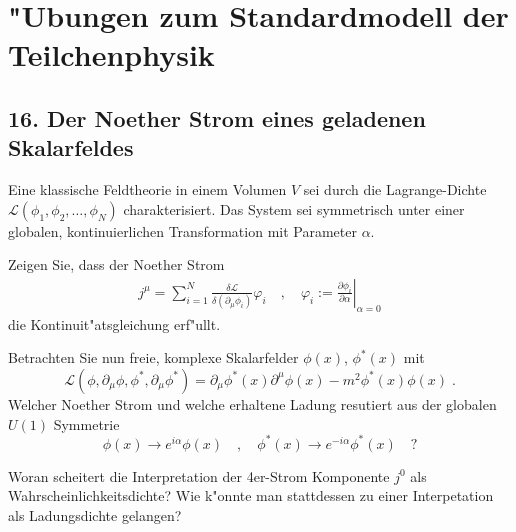 \documentclass[11pt,a4paper]{article}
\begin{document}
\section*{"Ubungen zum Standardmodell der Teilchenphysik}
\subsection*{16. Der Noether Strom eines geladenen Skalarfeldes}
Eine klassische Feldtheorie in einem Volumen $V$ sei durch die Lagrange-Dichte $\mathcal{L}(\phi_1, \phi_2, \ldots,\phi_N)$ charakterisiert. Das System sei symmetrisch unter einer globalen, kontinuierlichen Transformation mit Parameter $\alpha$.\par
Zeigen Sie, dass der Noether Strom
\begin{eqnarray}
j^\mu = \sum_{i=1}^N \frac{\delta\mathcal{L}}{\delta(\partial_\mu\phi_i)}\varphi_i \quad,\quad \varphi_i := \left.\frac{\partial\phi_i}{\partial\alpha}\right|_{\alpha=0}
\end{eqnarray}
die Kontinuit"atsgleichung erf"ullt.\par
Betrachten Sie nun freie, komplexe Skalarfelder $\phi(x)$, $\phi^*(x)$ mit
\[\mathcal{L}(\phi,\partial_\mu\phi,\phi^*,\partial_\mu\phi^*) = \partial_\mu\phi^*(x)\partial^\mu\phi(x) - m^2\phi^*(x)\phi(x) \;.\]
Welcher Noether Strom und welche erhaltene Ladung resutiert aus der globalen $U(1)$ Symmetrie
\[\phi(x) \rightarrow e^{i\alpha}\phi(x) \quad,\quad \phi^*(x) \rightarrow e^{-i\alpha}\phi^*(x) \quad?\]

Woran scheitert die Interpretation der 4er-Strom Komponente $j^0$ als Wahrscheinlichkeitsdichte? Wie k"onnte man stattdessen zu einer Interpetation als Ladungsdichte gelangen?
\end{document}
